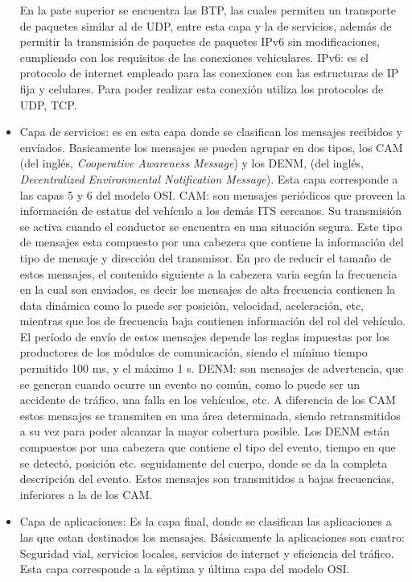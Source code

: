 \begin{itemize}
	\subitem En la pate superior se encuentra las BTP, las cuales permiten un transporte de paquetes similar al de UDP, entre esta capa y la de servicios, además de permitir la transmisión de paquetes de paquetes IPv6 sin modificaciones, cumpliendo con los requisitos de las conexiones vehiculares.  
	\subitem IPv6: es el protocolo de internet empleado para las conexiones con las estructuras de IP fija y celulares. Para poder realizar esta conexión utiliza los protocolos de UDP, TCP. 
	\item Capa de servicios: es en esta capa donde se clasifican los mensajes recibidos y envíados. Basicamente los mensajes se pueden agrupar en dos tipos, los CAM (del inglés, \textit{Cooperative Awareness Message}) y los DENM, (del inglés, \textit{Decentralized Environmental Notification Message}). Esta capa corresponde a las capas  5 y 6 del modelo OSI. 
	\subitem CAM: son mensajes periódicos que proveen la información de estatus del vehículo a los demás ITS cercanos. Su transmisión se activa cuando el conductor se encuentra en una situación segura. Este tipo de mensajes esta compuesto por una cabezera que contiene la información del tipo de mensaje y dirección del transmisor. En pro de reducir el tamaño de estos mensajes, el contenido siguiente a la cabezera varia según la frecuencia en la cual son enviados, es decir los mensajes de alta frecuencia contienen la data dinámica como lo puede ser posición, velocidad, aceleración, etc, mientras que los de frecuencia baja contienen información del rol del vehículo. El período de envío de estos mensajes depende las reglas impuestas por los productores de los módulos de comunicación, siendo el mínimo tiempo permitido 100 ms, y el máximo 1 s.
	\subitem DENM: son mensajes de advertencia, que se generan cuando ocurre un evento no común, como lo puede ser un accidente de tráfico, una falla en los vehículos, etc. A diferencia de los CAM estos mensajes se transmiten en una área determinada, siendo retransmitidos a su vez para poder alcanzar la mayor cobertura posible. Los DENM están compuestos por una cabezera que contiene el tipo del evento, tiempo en que se detectó, posición etc. seguidamente del cuerpo, donde se da la completa descripción del evento. Estos mensajes son transmitidos a bajas frecuencias, inferiores a la de los CAM. 
	\item Capa de aplicaciones: Es la capa final, donde se clasifican las aplicaciones a las que estan destinados los mensajes. Básicamente la aplicaciones son cuatro: Seguridad vial, servicios locales, servicios de internet y eficiencia del tráfico. Esta capa corresponde a la séptima y última capa del modelo OSI.
\end{itemize}



